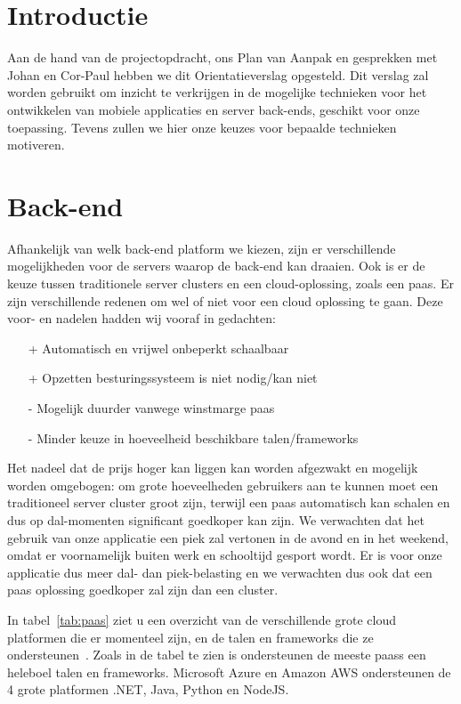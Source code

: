 \section{Introductie}

Aan de hand van de projectopdracht, ons Plan van Aanpak en gesprekken met Johan en Cor-Paul hebben we dit Orientatieverslag opgesteld. Dit verslag zal worden gebruikt om inzicht te verkrijgen in de mogelijke technieken voor het ontwikkelen van mobiele applicaties en server back-ends, geschikt voor onze toepassing. Tevens zullen we hier onze keuzes voor bepaalde technieken motiveren.

\section{Back-end}\label{sec:orientatie-back-end}
Afhankelijk van welk back-end platform we kiezen, zijn er verschillende mogelijkheden voor de servers waarop de back-end kan draaien. Ook is er de keuze tussen traditionele server clusters en een cloud-oplossing, zoals een \ac{paas}. Er zijn verschillende redenen om wel of niet voor een cloud oplossing te gaan. Deze voor- en nadelen hadden wij vooraf in gedachten: 
\begin{itemize} 
    \item[+] Automatisch en vrijwel onbeperkt schaalbaar
    \item[+] Opzetten besturingssysteem is niet nodig/kan niet
    \item[-] Mogelijk duurder vanwege winstmarge \ac{paas}
    \item[-] Minder keuze in hoeveelheid beschikbare talen/frameworks
\end{itemize}

Het nadeel dat de prijs hoger kan liggen kan worden afgezwakt en mogelijk worden omgebogen: om grote hoeveelheden gebruikers aan te kunnen moet een traditioneel server cluster groot zijn, terwijl een \ac{paas} automatisch kan schalen en dus op dal-momenten significant goedkoper kan zijn. We verwachten dat het gebruik van onze applicatie een piek zal vertonen in de avond en in het weekend, omdat er voornamelijk buiten werk en schooltijd gesport wordt. Er is voor onze applicatie dus meer dal- dan piek-belasting en we verwachten dus ook dat een \ac{paas} oplossing goedkoper zal zijn dan een cluster.

In tabel~\ref{tab:paas} ziet u een overzicht van de verschillende grote cloud platformen die er momenteel zijn, en de talen en frameworks die ze ondersteunen~\cite{paas-list-tomsitpro, azure-scala, aws}. Zoals in de tabel te zien is ondersteunen de meeste \acp{paas} een heleboel talen en frameworks. Microsoft Azure en Amazon AWS ondersteunen de 4 grote platformen .NET, Java, Python en NodeJS.


